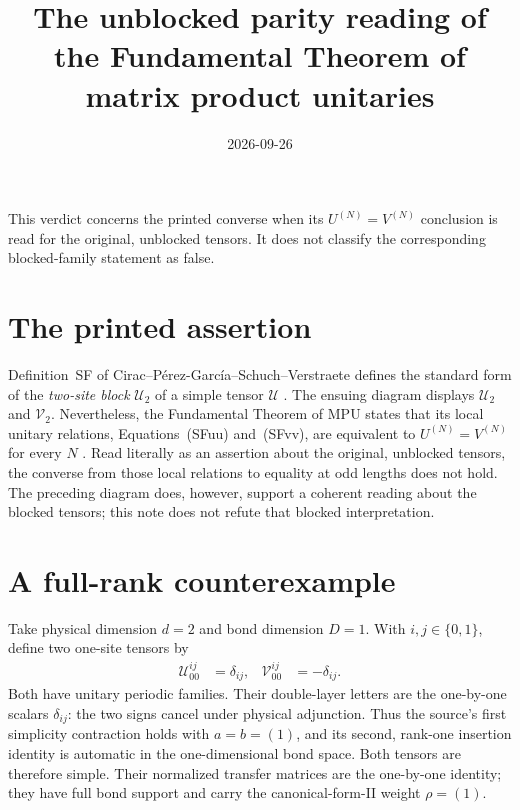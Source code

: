 \documentclass{article}
\title{The unblocked parity reading of the Fundamental Theorem of matrix product unitaries}
\author{}
\date{2026-09-26}
\begin{document}
\maketitle
{}

This verdict concerns the printed converse when its $U^{(N)}=V^{(N)}$
conclusion is read for the original, unblocked tensors. It does not classify
the corresponding blocked-family statement as false.

\section{The printed assertion}

Definition~SF of Cirac--P\'erez-Garc\'ia--Schuch--Verstraete defines the
standard form of the \emph{two-site block} $\mathcal U_2$ of a simple tensor
$\mathcal U$ \cite[lines~619--622]{Cirac2017MPU}. The ensuing diagram displays
$\mathcal U_2$ and $\mathcal V_2$. Nevertheless, the Fundamental Theorem of
MPU states that its local unitary relations, Equations~(SFuu) and~(SFvv),
are equivalent to $U^{(N)}=V^{(N)}$ for every $N$
\cite[lines~624--648]{Cirac2017MPU}. Read literally as an assertion about
the original, unblocked tensors, the converse from those local relations to
equality at odd lengths does not hold. The preceding diagram does, however,
support a coherent reading about the blocked tensors; this note does not
refute that blocked interpretation.

\section{A full-rank counterexample}

Take physical dimension $d=2$ and bond dimension $D=1$. With $i,j\in
    \{0,1\}$, define two one-site tensors by
\begin{align}
    \mathcal U^{ij}_{00} & =\delta_{ij},  &
    \mathcal V^{ij}_{00} & =-\delta_{ij}.
    \label{eq:mpu_standard_form_parity_letters}
\end{align}
Both have unitary periodic families. Their double-layer letters are the
one-by-one scalars $\delta_{ij}$: the two signs cancel under physical
adjunction. Thus the source's first simplicity contraction holds with
$a=b=(1)$, and its second, rank-one insertion identity is automatic in the
one-dimensional bond space. Both tensors are therefore simple. Their
normalized transfer matrices are the one-by-one identity; they have full bond
support and carry the canonical-form-II weight $\rho=(1)$.
\end{document}

